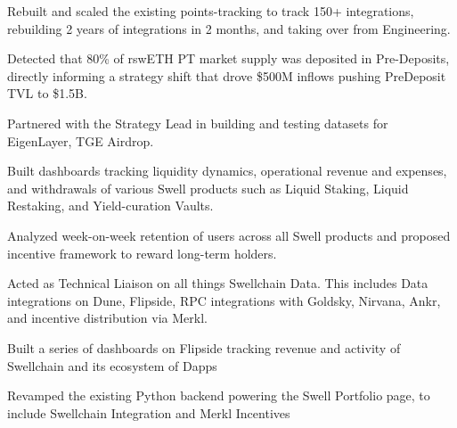 \vspace{0.4cm}
    \begin{zitemize}
        \item Rebuilt and scaled the existing points-tracking to track 150+ integrations, rebuilding 2 years of integrations in 2 months, and taking over from Engineering. 
        \item Detected that 80\% of rswETH PT market supply was deposited in Pre-Deposits, directly informing a strategy shift that drove \$500M inflows pushing PreDeposit TVL to \$1.5B.
        \item Partnered with the Strategy Lead in building and testing datasets for EigenLayer, TGE Airdrop. 
        \item Built dashboards tracking liquidity dynamics, operational revenue and expenses, and withdrawals of various Swell products such as Liquid Staking, Liquid Restaking, and Yield-curation Vaults.
        \item Analyzed week-on-week retention of users across all Swell products and proposed incentive framework to reward long-term holders.
        \item Acted as Technical Liaison on all things Swellchain Data. This includes Data integrations on Dune, Flipside, RPC integrations with Goldsky, Nirvana, Ankr, and incentive distribution via Merkl. 
        \item Built a series of dashboards on Flipside tracking revenue and activity of Swellchain and its ecosystem of Dapps
        \item Revamped the existing Python backend powering the Swell Portfolio page, to include Swellchain Integration and Merkl Incentives
    \end{zitemize}